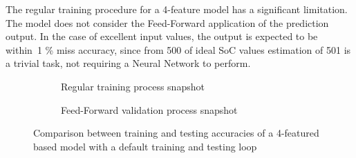 The regular training procedure for a 4-feature model has a significant limitation. The model does not consider the Feed-Forward application of the prediction output.
In the case of excellent input values, the output is expected to be within~1 \% miss accuracy, since from 500 of ideal SoC values estimation of 501 is a trivial task, not requiring a Neural Network to perform.
\begin{figure}[htbp]
    \centering
    \begin{subfigure}[b]{\columnwidth}
        \centering
        
        \caption{Regular training process snapshot}
        \label{subfig:regular_tr}
    \end{subfigure}
    \hfill
    \begin{subfigure}[b]{\columnwidth}
        \centering
        
        \caption{Feed-Forward validation process snapshot}
        \label{subfig:regular_ts}
    \end{subfigure}
    \caption{Comparison between training and testing accuracies of a 4-featured based model with a default training and testing loop}
    \label{fig:regular_tr}
\end{figure}

